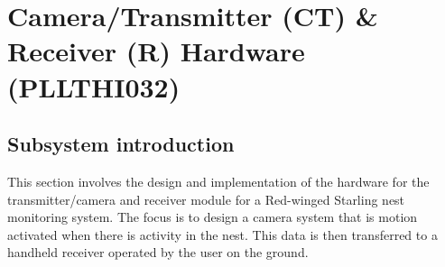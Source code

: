 \documentclass[class=report,11pt,crop=false]{standalone}
\begin{document}
\ifstandalone
\tableofcontents
\fi
\chapter{Camera/Transmitter (CT) \& Receiver (R) Hardware (PLLTHI032)\label{ch:hardware}}


\section{Subsystem introduction}\label{sc: HW_intro}
This section involves the design and implementation of the hardware for the transmitter/camera and receiver module for a Red-winged Starling nest monitoring system. The focus is to design a camera system that is motion activated when there is activity in the nest. This data is then transferred to a handheld receiver operated by the user on the ground. 
\end{document}
